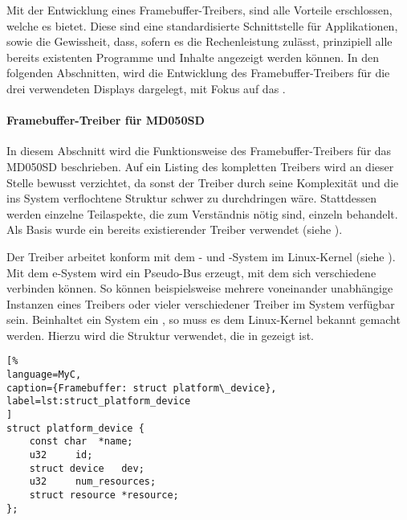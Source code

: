 Mit der Entwicklung eines Framebuffer-Treibers, sind alle Vorteile erschlossen, welche es bietet. Diese sind eine standardisierte Schnittstelle für Applikationen, sowie die Gewissheit, dass, sofern es die Rechenleistung zulässt, prinzipiell alle bereits existenten Programme und Inhalte angezeigt werden können.
In den folgenden Abschnitten, wird die Entwicklung des Framebuffer-Treibers für die drei verwendeten Displays dargelegt, mit Fokus auf das . 
\paragraph{Framebuffer-Treiber für MD050SD}
\label{cha:framebuffer}
In diesem Abschnitt wird die Funktionsweise des Framebuffer-Treibers für das MD050SD beschrieben. Auf ein Listing des kompletten Treibers wird an dieser Stelle bewusst verzichtet, da sonst der Treiber durch seine Komplexität und die ins System verflochtene Struktur schwer zu durchdringen wäre. Stattdessen werden einzelne Teilaspekte, die zum Verständnis nötig sind, einzeln behandelt. Als Basis wurde ein bereits existierender Treiber verwendet (siehe \cite{Schlegel2013c}).

Der Treiber arbeitet konform mit dem - und -System im Linux-Kernel (siehe \cite{LinuxKernelPlatformDeviceDriver}). Mit dem e-System wird ein Pseudo-Bus erzeugt, mit dem sich verschiedene  verbinden können. So können beispielsweise mehrere voneinander unabhängige Instanzen eines Treibers oder vieler verschiedener Treiber im System verfügbar sein. Beinhaltet ein System ein , so muss es dem Linux-Kernel bekannt gemacht werden. Hierzu wird die Struktur  verwendet, die in  gezeigt ist.

\begin{lstlisting}[%
language=MyC,
caption={Framebuffer: struct platform\_device},
label=lst:struct_platform_device
]
struct platform_device {
	const char	*name;
	u32		id;
	struct device	dev;
	u32		num_resources;
	struct resource	*resource;
};
\end{lstlisting}

